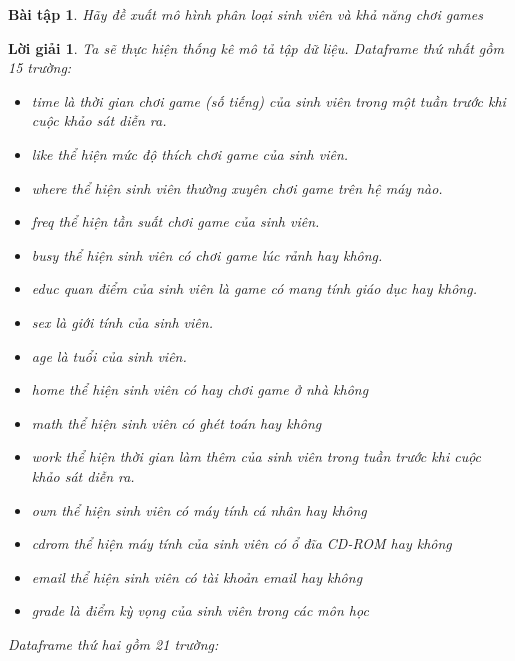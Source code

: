 \documentclass[14pt, a4paper]{article}
\theoremstyle{sltheorem}
\newtheorem{baitap}{Bài tập}
\theoremstyle{soltheorem}
\newtheorem*{loigiai}{Lời giải}
\begin{document}
\begin{baitap}
    Hãy đề xuất mô hình phân loại sinh viên và khả năng chơi games
\end{baitap}

\begin{loigiai}
    Ta sẽ thực hiện thống kê mô tả tập dữ liệu.
    Dataframe thứ nhất gồm 15 trường:

    \begin{itemize}
        \item time là thời gian chơi game (số tiếng) của sinh viên trong một tuần trước khi cuộc khảo sát diễn ra.
        \item like thể hiện mức độ thích chơi game của sinh viên.
        \item where thể hiện sinh viên thường xuyên chơi game trên hệ máy nào.
        \item freq thể hiện tần suất chơi game của sinh viên.
        \item busy thể hiện sinh viên có chơi game lúc rảnh hay không.
        \item educ quan điểm của sinh viên là game có mang tính giáo dục hay không.
        \item sex là giới tính của sinh viên.
        \item age là tuổi của sinh viên.
        \item home thể hiện sinh viên có hay chơi game ở nhà không
        \item math thể hiện sinh viên có ghét toán hay không
        \item work thể hiện thời gian làm thêm của sinh viên trong tuần trước khi cuộc khảo sát diễn ra.
        \item own thể hiện sinh viên có máy tính cá nhân hay không
        \item cdrom thể hiện máy tính của sinh viên có ổ đĩa CD-ROM hay không
        \item email thể hiện sinh viên có tài khoản email hay không
        \item grade là điểm kỳ vọng của sinh viên trong các môn học
    \end{itemize}

    Dataframe thứ hai gồm 21 trường:


\end{loigiai}
\end{document}
